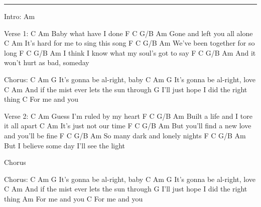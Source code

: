 \noindent\rule{\columnwidth}{1pt}

\begin{multicols}{2}
\begin{lstsong}
Intro: Am

Verse 1:
  C                Am
 Baby what have I done
F          C        G/B  Am
 Gone and left you all alone
  C                             Am
 It's hard for me to sing this song
F              C      G/B    Am
 We've been together for so long
F                     C         G/B    Am
 I think I know what my soul's got to say
F              C       G/B      Am
 And it won't hurt as bad, someday

Chorus:
                C  Am     G
 It's gonna be al-right, baby
                C  Am     G
 It's gonna be al-right, love
             C                      Am
 And if the mist ever lets the sun through
            G
 I'll just hope I did the right thing
             C
 For me and you
\end{lstsong}
\columnbreak
\begin{lstsong}
Verse 2:
  C                     Am
 Guess I'm ruled by my heart
F                  C         G/B  Am
 Built a life and I tore it all apart
  C                 Am
 It's just not our time
F                   C            G/B       Am
 But you'll find a new love and you'll be fine
F         C        G/B    Am
 So many dark and lonely nights
F                    C        G/B     Am
 But I believe some day I'll see the light
 
Chorus

Chorus:
               C  Am     G
It's gonna be al-right, baby
                C  Am     G
It's gonna be al-right, love
             C                      Am
And if the mist ever lets the sun through
            G
I'll just hope I did the right thing
             Am
For me and you
             C
For me and you
\end{lstsong}
\end{multicols}
\newpage


